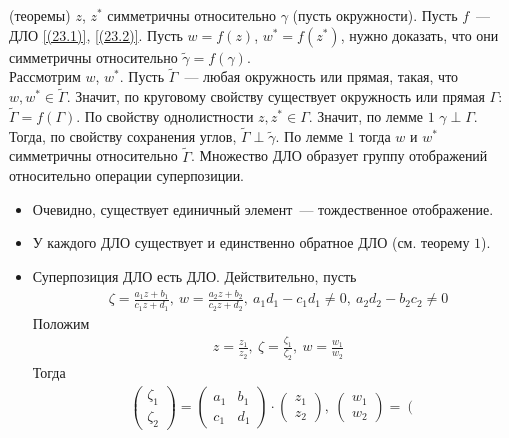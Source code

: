 \pr (теоремы)
$z$, $z^*$ симметричны относительно $\gamma$ (пусть окружности). Пусть $f$~---
ДЛО \eqref{(23.1)}, \eqref{(23.2)}. Пусть $w = f(z)$, $w^* = f(z^*)$, нужно
доказать, что они симметричны относительно $\tilde{\gamma} = f(\gamma)$.
\\
Рассмотрим $w$, $w^*$. Пусть $\tilde{\Gamma}$~--- любая окружность или прямая,
такая, что $w, w^* \in \tilde{\Gamma}$. Значит, по круговому свойству существует
окружность или прямая $\Gamma$: $\tilde{\Gamma} = f(\Gamma)$. По свойству
однолистности $z, z^* \in \Gamma$. Значит, по лемме $1$ $\gamma \perp \Gamma$.
Тогда, по свойству сохранения углов, $\tilde{\Gamma} \perp \tilde{\gamma}$. По
лемме $1$ тогда $w$ и $w^*$ симметричны относительно $\tilde{\Gamma}$.
\theorem
Множество ДЛО образует группу отображений относительно операции суперпозиции.
\pr
~
\begin{itemize}
    \item Очевидно, существует единичный элемент~--- тождественное отображение.
    \item У каждого ДЛО существует и единственно обратное ДЛО (см. теорему $1$).
    \item Суперпозиция ДЛО есть ДЛО. Действительно, пусть
    \begin{align*}
      & \zeta = \frac{a_1z+b_1}{c_1z+d_1}, \ w = \frac{a_2z+b_2}{c_2z+d_2}, \ a_1d_1 - c_1d_1 \neq 0, \ a_2d_2 - b_2c_2 \neq 0
    \end{align*}
    Положим
    \begin{align*}
      & z = \frac{z_1}{z_2}, \ \zeta = \frac{\zeta_1}{\zeta_2}, \ w = \frac{w_1}{w_2}
    \end{align*}
    Тогда
    \begin{align*}
      & \left( \begin{matrix}
              \zeta_1 \\
              \zeta_2
          \end{matrix} \right) = \left( \begin{matrix}
              a_1 & b_1 \\
              c_1 & d_1
          \end{matrix} \right) \cdot \left( \begin{matrix}
              z_1 \\
              z_2
          \end{matrix} \right), \ \left( \begin{matrix}
              w_1 \\
              w_2
          \end{matrix} \right) = \left( \begin{matrix}

\end{matrix}
\end{align*}
\end{itemize}
